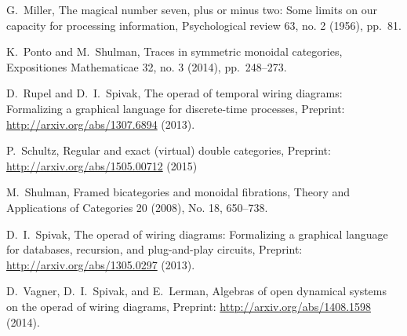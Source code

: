 \documentclass[12pt,oneside,article,draft]{memoir}
\begin{document}
\begin{thebibliography}{XXX}
 G.~Miller, The magical number seven, plus or minus two: Some limits on our capacity for processing information, Psychological review 63, no. 2 (1956), pp.~81.

 K.~Ponto and M.~Shulman, Traces in symmetric monoidal categories, Expositiones Mathematicae 32, no. 3 (2014), pp.~248--273.

 D.~Rupel and D.~I.~Spivak, The operad of temporal wiring diagrams: Formalizing a graphical language for discrete-time processes, Preprint: \url{http://arxiv.org/abs/1307.6894} (2013).

 P.~Schultz, Regular and exact (virtual) double categories, Preprint: \url{http://arxiv.org/abs/1505.00712} (2015)
 
 M.~Shulman, Framed bicategories and monoidal fibrations, Theory and Applications of Categories 20 (2008), No. 18, 650--738.
 
 D.~I.~Spivak, The operad of wiring diagrams: Formalizing a graphical language for databases, recursion, and plug-and-play circuits, Preprint: \url{http://arxiv.org/abs/1305.0297} (2013).

 D.~Vagner, D.~I.~Spivak, and E.~Lerman, Algebras of open dynamical systems on the operad of wiring diagrams, Preprint: \url{http://arxiv.org/abs/1408.1598} (2014).

\end{thebibliography}
\end{document}
